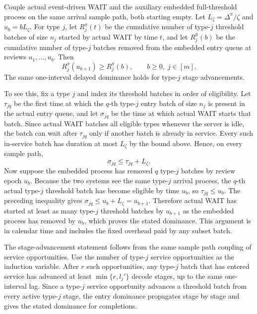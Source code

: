 \begin{lemma}\label{lem:wait_one_slot_dominance}
Couple actual event-driven WAIT and the auxiliary embedded full-threshold process on the same arrival sample path, both starting empty. Let \(L_\zeta=\Delta^\pi/\zeta\) and \(u_b=bL_\zeta\). For type \(j\), let \(R_j^\pi(t)\) be the cumulative number of type-\(j\) threshold batches of size \(n_j\) started by actual WAIT by time \(t\), and let \(R_j^{\bar\pi}(b)\) be the cumulative number of type-\(j\) batches removed from the embedded entry queue at reviews \(u_1,\ldots,u_b\). Then
\[
    R_j^\pi(u_{b+1})\ge R_j^{\bar\pi}(b),
    \qquad b\ge0,\; j\in[m].
\]
The same one-interval delayed dominance holds for type-\(j\) stage advancements.
\end{lemma}
\noindent To see this, fix a type \(j\) and index its threshold batches in order of eligibility. Let \(\tau_{jq}\) be the first time at which the \(q\)-th type-\(j\) entry batch of size \(n_j\) is present in the actual entry queue, and let \(\sigma_{jq}\) be the time at which actual WAIT starts that batch. Since actual WAIT batches all eligible types whenever the server is idle, the batch can wait after \(\tau_{jq}\) only if another batch is already in service. Every such in-service batch has duration at most \(L_\zeta\) by the bound above. Hence, on every sample path,
\[
    \sigma_{jq}\le \tau_{jq}+L_\zeta .
\]
Now suppose the embedded process has removed \(q\) type-\(j\) batches by review epoch \(u_b\). Because the two systems see the same type-\(j\) arrival process, the \(q\)-th actual type-\(j\) threshold batch has become eligible by time \(u_b\), so \(\tau_{jq}\le u_b\). The preceding inequality gives \(\sigma_{jq}\le u_b+L_\zeta=u_{b+1}\). Therefore actual WAIT has started at least as many type-\(j\) threshold batches by \(u_{b+1}\) as the embedded process has removed by \(u_b\), which proves the stated dominance. This argument is in calendar time and includes the fixed overhead paid by any subset batch.

The stage-advancement statement follows from the same sample path coupling of service opportunities. Use the number of type-\(j\) service opportunities as the induction variable. After \(r\) such opportunities, any type-\(j\) batch that has entered service has advanced at least \(\min\{r,l_j'\}\) decode stages, up to the same one-interval lag. Since a type-\(j\) service opportunity advances a threshold batch from every active type-\(j\) stage, the entry dominance propagates stage by stage and gives the stated dominance for completions.

